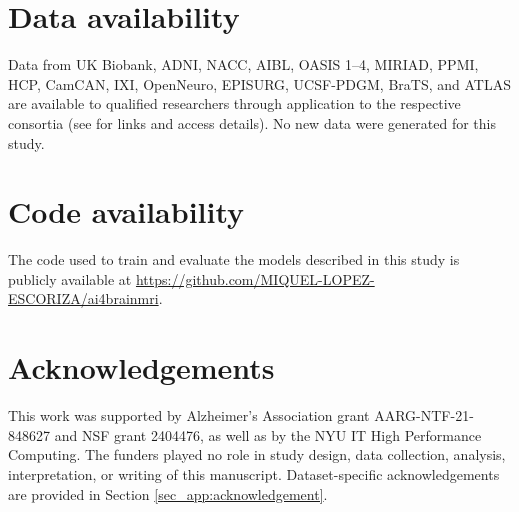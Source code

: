 \documentclass[pdflatex,sn-nature]{sn-jnl}%
\newif\ifhighlight
\newcommand{\rev}[1]{\ifhighlight{\color{blue}{}#1}\else#1\fi}%
\newcommand{\revdel}[1]{\ifhighlight{\color{red}\sout{#1}}\fi}
\theoremstyle{thmstyleone}%
\theoremstyle{thmstyletwo}%
\theoremstyle{thmstylethree}%
\begin{document}



\section*{Data availability}
Data from UK Biobank, ADNI, NACC, AIBL, OASIS 1--4, MIRIAD, PPMI, HCP, CamCAN, IXI, OpenNeuro, EPISURG, UCSF-PDGM, BraTS, and ATLAS are available to qualified researchers through application to the respective consortia (see \revdel{Appendix A} for links and access details). No new data were generated for this study.

\section*{Code availability}
The code used to train and evaluate the models described in this study is publicly available at \url{https://github.com/MIQUEL-LOPEZ-ESCORIZA/ai4brainmri}.

\section*{Acknowledgements}
This work was supported by Alzheimer’s Association grant AARG-NTF-21-848627 and NSF grant 2404476, as well as by the NYU IT High Performance Computing. The funders played no role in study design, data collection, analysis, interpretation, or writing of this manuscript.  Dataset-specific acknowledgements are provided in \revdel{Appendix} Section \ref{sec_app:acknowledgement}.
\end{document}
